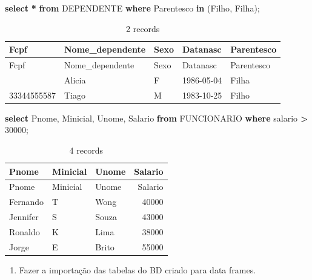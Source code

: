 \documentclass[
]{article}
\newenvironment{Shaded}{\begin{snugshade}}{\end{snugshade}}
\newcommand{\DecValTok}[1]{\textcolor[rgb]{0.00,0.00,0.81}{#1}}
\newcommand{\KeywordTok}[1]{\textcolor[rgb]{0.13,0.29,0.53}{\textbf{#1}}}
\newcommand{\NormalTok}[1]{#1}
\newcommand{\OperatorTok}[1]{\textcolor[rgb]{0.81,0.36,0.00}{\textbf{#1}}}
\newcommand{\StringTok}[1]{\textcolor[rgb]{0.31,0.60,0.02}{#1}}
\providecommand{\tightlist}{%
  \setlength{\itemsep}{0pt}\setlength{\parskip}{0pt}}
\begin{document}
\begin{Shaded}
\begin{Highlighting}[]
\KeywordTok{select} \OperatorTok{*} \KeywordTok{from}\NormalTok{ DEPENDENTE }\KeywordTok{where}\NormalTok{ Parentesco }\KeywordTok{in}\NormalTok{ (}\StringTok{\textquotesingle{}Filho\textquotesingle{}}\NormalTok{, }\StringTok{\textquotesingle{}Filha\textquotesingle{}}\NormalTok{);}
\end{Highlighting}
\end{Shaded}

\begin{longtable}[]{@{}lllll@{}}
\caption{2 records}\tabularnewline
\toprule\noalign{}
Fcpf & Nome\_dependente & Sexo & Datanasc & Parentesco \\
\midrule\noalign{}
\endfirsthead
\toprule\noalign{}
Fcpf & Nome\_dependente & Sexo & Datanasc & Parentesco \\
\midrule\noalign{}
\endhead
\bottomrule\noalign{}
\endlastfoot
33344555587 & Alicia & F & 1986-05-04 & Filha \\
33344555587 & Tiago & M & 1983-10-25 & Filho \\
\end{longtable}

\begin{Shaded}
\begin{Highlighting}[]
\KeywordTok{select}\NormalTok{ Pnome, Minicial, Unome, Salario }\KeywordTok{from}\NormalTok{ FUNCIONARIO }\KeywordTok{where}\NormalTok{ salario }\OperatorTok{\textgreater{}} \DecValTok{30000}\NormalTok{;}
\end{Highlighting}
\end{Shaded}

\begin{longtable}[]{@{}lllr@{}}
\caption{4 records}\tabularnewline
\toprule\noalign{}
Pnome & Minicial & Unome & Salario \\
\midrule\noalign{}
\endfirsthead
\toprule\noalign{}
Pnome & Minicial & Unome & Salario \\
\midrule\noalign{}
\endhead
\bottomrule\noalign{}
\endlastfoot
Fernando & T & Wong & 40000 \\
Jennifer & S & Souza & 43000 \\
Ronaldo & K & Lima & 38000 \\
Jorge & E & Brito & 55000 \\
\end{longtable}

\begin{enumerate}
\def\labelenumi{\arabic{enumi}.}
\setcounter{enumi}{2}
\tightlist
\item
  Fazer a importação das tabelas do BD criado para data frames.
\end{enumerate}
\end{document}
